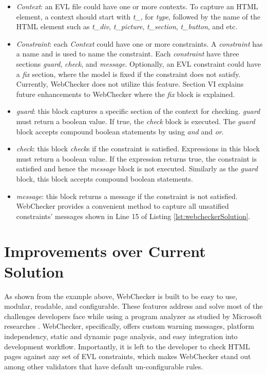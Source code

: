 \documentclass[conference]{IEEETran}
\begin{document}
\begin{itemize}
\item \textit{Context}: an EVL file could have one or more contexts. To capture an HTML element, a context should start with \textit{t\_}, for \textit{type}, followed by the name of the HTML element such as \textit{t\_div}, \textit{t\_picture}, \textit{t\_section}, \textit{t\_button}, and etc.
\item \textit{Constraint}: each \textit{Context} could have one or more constraints. A \textit{constraint} has a name and is used to name the constraint. Each \textit{constraint} have three sections \textit{guard}, \textit{check}, and \textit{message}. Optionally, an EVL constraint could have a \textit{fix} section, where the model is fixed if the constraint does not satisfy. Currently, WebChecker does not utilize this feature. Section VI explains future enhancements to WebChecker where the \textit{fix} block is explained. 
\item \textit{guard}: this block captures a specific section of the context for checking. \textit{guard} must return a boolean value. If true, the \textit{check} block is executed. The \textit{guard} block accepts compound boolean statements by using \textit{and} and \textit{or}.      
\end{itemize}
\begin{itemize}
\item \textit{check}: this block \textit{check}s if the constraint is satisfied. Expressions in this block must return a boolean value. If the expression returns true, the constraint is satisfied and hence the \textit{message} block is not executed. Similarly as the \textit{guard} block, this block accepts compound boolean statements.
\item \textit{message}: this block returns a message if the constraint is not satisfied. WebChecker provides a convenient method to capture all unsatified constraints' messages shown in Line 15 of Listing \ref{lst:webcheckerSolution}.  
\end{itemize}

\section{Improvements over Current Solution}
As shown from the example above, WebChecker is built to be easy to use, modular, readable, and configurable. These features address and solve most of the challenges developers face while using a program analyzer as studied by Microsoft researches \cite{christakis16}. WebChecker, specifically, offers custom warning messages, platform independency, static and dynamic page analysis, and easy integration into development workflow. Importantly, it is left to the developer to check HTML pages against any set of EVL constraints, which makes WebChecker stand out among other validators that have default un-configurable rules.    
\end{document}
